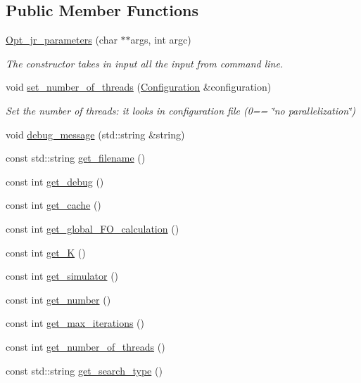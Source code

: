 \subsection*{Public Member Functions}
\begin{DoxyCompactItemize}
\item 
\hyperlink{classOpt__jr__parameters_aae142f498b266523f275dba7a407326d}{Opt\-\_\-jr\-\_\-parameters} (char $\ast$$\ast$args, int argc)
\begin{DoxyCompactList}\small\item\em The constructor takes in input all the input from command line. \end{DoxyCompactList}\item 
void \hyperlink{classOpt__jr__parameters_a19769e398ca6969a851cc6584cfa4dd0}{set\-\_\-number\-\_\-of\-\_\-threads} (\hyperlink{classConfiguration}{Configuration} \&configuration)
\begin{DoxyCompactList}\small\item\em Set the number of threads\-: it looks in configuration file (0== \char`\"{}no parallelization\char`\"{}) \end{DoxyCompactList}\item 
void \hyperlink{classOpt__jr__parameters_a860bf209221b6c5e1c4394d1ae4a058f}{debug\-\_\-message} (std\-::string \&string)
\item 
const std\-::string \hyperlink{classOpt__jr__parameters_a7cef75cfec6d554805e311d7b4c37ef2}{get\-\_\-filename} ()
\item 
const int \hyperlink{classOpt__jr__parameters_ae22fb9f311cca37788ea5cf054e83aa7}{get\-\_\-debug} ()
\item 
const int \hyperlink{classOpt__jr__parameters_a38b9495684e078740fc009c7a25ef643}{get\-\_\-cache} ()
\item 
const int \hyperlink{classOpt__jr__parameters_a5437ef881f921ae81f5e3d93fbac7e2a}{get\-\_\-global\-\_\-\-F\-O\-\_\-calculation} ()
\item 
const int \hyperlink{classOpt__jr__parameters_a8b6c548de42e286a8848b198280aa2dc}{get\-\_\-\-K} ()
\item 
const int \hyperlink{classOpt__jr__parameters_a198ee52d6e6bd479255e57f3fe12af0b}{get\-\_\-simulator} ()
\item 
const int \hyperlink{classOpt__jr__parameters_a8bafd6844417b1f64ddefcf84fb726cb}{get\-\_\-number} ()
\item 
const int \hyperlink{classOpt__jr__parameters_a4666611fbf651a76876a0356ad204df1}{get\-\_\-max\-\_\-iterations} ()
\item 
const int \hyperlink{classOpt__jr__parameters_a186166286122c263aac7bb8fe56d6751}{get\-\_\-number\-\_\-of\-\_\-threads} ()
\item 
const std\-::string \hyperlink{classOpt__jr__parameters_a77f9d51e7183e9af98e6211f444ed6b4}{get\-\_\-search\-\_\-type} ()
\end{DoxyCompactItemize}
